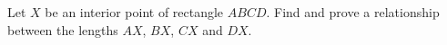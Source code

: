 Let $X$ be an interior point of rectangle $ABCD$. Find and prove a relationship between the lengths $AX$, $BX$, $CX$ and $DX$.
